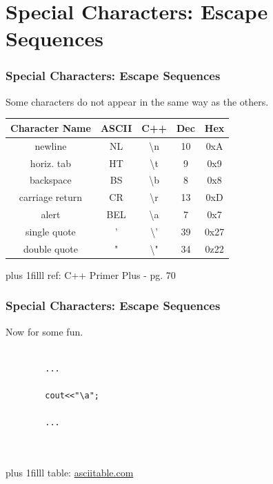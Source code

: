\documentclass[fleqn]{beamer} %
\newcommand{\sectiontitleIII}{Special Characters: Escape Sequences}
\newcommand{\btVFill}{\vskip0pt plus 1filll}
\begin{document}
\section{\sectiontitleIII}

	\begin{frame}[label=sectionIII] \small
		\frametitle{\sectiontitleIII}
	
		Some characters do not appear in the same way as the others.  \vspace{1mm} \\
	
			\renewcommand*{\arraystretch}{1.5}
		\begin{tabular}{c|c|c|c|c} 
			Character Name&ASCII&C++&Dec&Hex\\ \hline
			newline& NL& \textbackslash n& 10 & 0xA\\ \hline
			horiz. tab& HT& \textbackslash t & 9 & 0x9\\ \hline
			backspace& BS& \textbackslash b & 8 & 0x8\\ \hline
			carriage return & CR & \textbackslash r& 13& 0xD\\ \hline
			alert& BEL& \textbackslash a & 7 & 0x7\\ \hline
			single quote& ' & \textbackslash '& 39& 0x27\\ \hline
			double quote& "& \textbackslash "& 34& 0z22\\ \hline
	
		\end{tabular}
		
		\btVFill
		\tiny{ref: C++ Primer Plus - pg. 70}
	\end{frame}

	\begin{frame}[label=sectionIII,containsverbatim] \small
	\frametitle{\sectiontitleIII}
	
		Now for some fun.
	
		\begin{lstlisting}
		
		...
		
		cout<<"\a";
		
		...
		
		
		\end{lstlisting}
	
		\btVFill
		\tiny{table: \href{http://www.asciitable.com/}{asciitable.com}}
	\end{frame}
\end{document}
